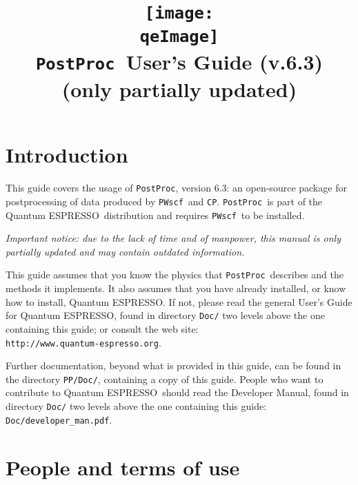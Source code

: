 \documentclass[12pt,a4paper]{article}
\def\version{6.3}
\def\qe{{\sc Quantum ESPRESSO}}
\def\PWscf{\texttt{PWscf}}
\def\CP{\texttt{CP}}
\def\PostProc{\texttt{PostProc}}
\begin{document}
 
\author{}
\date{}

\def\qeImage{../../Doc/quantum_espresso.pdf}

\title{
  \texttt{[image: \\qeImage]} \\
  \Huge \PostProc\ User's Guide (v.\version) 
  \\ \Large (only partially updated)
}

\maketitle

\tableofcontents

\section{Introduction}

This guide covers the usage of \PostProc, version \version: 
an open-source package for postprocessing of data produced by
\PWscf\ and \CP. \PostProc\ is part of the \qe\ distribution 
and requires \PWscf\ to be installed.

{\em Important notice: due to the lack of time and of manpower, this
manual is only partially updated and may contain outdated information.}

This guide assumes that you know the physics 
that \PostProc\ describes and the methods it implements.
It also assumes  that you have already installed,
or know how to install, \qe. If not, please read
the general User's Guide for \qe, found in 
directory \texttt{Doc/} two levels above the 
one containing this guide; or consult the web site:\\
\texttt{http://www.quantum-espresso.org}.

Further documentation, beyond what is provided 
in this guide, can be found in the directory
\texttt{PP/Doc/}, containing a copy of this guide.
People who want to contribute to \qe\ should read the 
Developer Manual, found in directory \texttt{Doc/} two levels
above the one containing this guide: \texttt{Doc/developer\_man.pdf}.

\section{People and terms of use}
\end{document}
